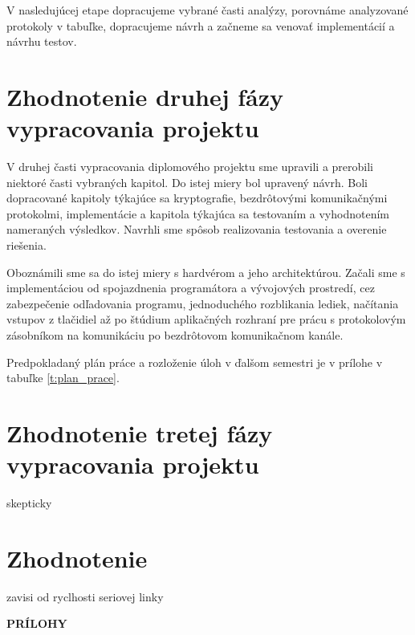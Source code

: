 \documentclass[12pt,a4wide,oneside,openright]{report}
\begin{document}
V nasledujúcej etape dopracujeme vybrané časti analýzy, porovnáme analyzované protokoly v tabuľke, dopracujeme návrh a začneme sa venovať implementácií a návrhu testov.

\section{Zhodnotenie druhej fázy vypracovania projektu}
V druhej časti vypracovania diplomového projektu sme upravili a prerobili niektoré časti vybraných kapitol. Do istej miery bol upravený návrh. Boli dopracované kapitoly týkajúce sa kryptografie, bezdrôtovými komunikačnými protokolmi, implementácie a kapitola týkajúca sa testovaním a vyhodnotením nameraných výsledkov. Navrhli sme spôsob realizovania testovania a overenie riešenia.

Oboznámili sme sa do istej miery s hardvérom a jeho architektúrou. Začali sme s implementáciou od spojazdnenia programátora a vývojových prostredí, cez zabezpečenie odľadovania programu, jednoduchého rozblikania lediek, načítania vstupov z tlačidiel až po štúdium aplikačných rozhraní pre prácu s protokolovým zásobníkom na komunikáciu po bezdrôtovom komunikačnom kanále.

Predpokladaný plán práce a rozloženie úloh v ďalšom semestri je v prílohe v tabuľke \ref{t:plan_prace}.


\section{Zhodnotenie tretej fázy vypracovania projektu}
skepticky
\section{Zhodnotenie}
zavisi od ryclhosti seriovej linky

\clearpage
{}
{}



\newpage
\thispagestyle{empty}
\vspace*{10cm}
\hspace*{5cm}
\textbf{\LARGE{PRÍLOHY}}
\end{document}
